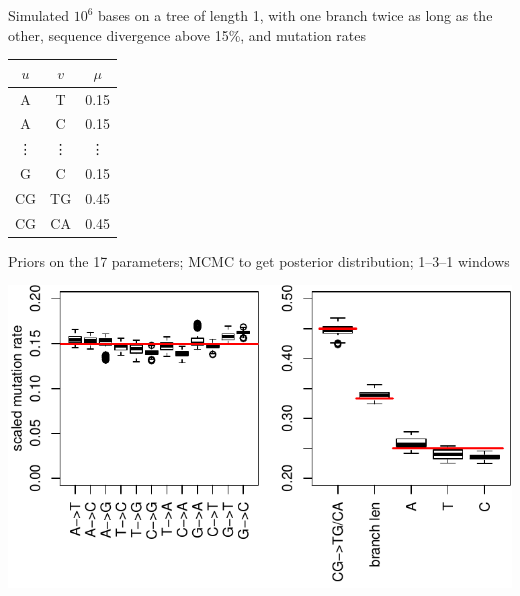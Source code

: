 \documentclass[fontscale=0.38]{baposter}
\begin{document}
\begin{poster}
{  Simulated $10^6$ bases on a tree of length 1, 
  with one branch twice as long as the other,
  sequence divergence above 15\%,
  and mutation rates
  {\small
  \begin{center}
    \begin{tabular}{c@{\quad$\to$\quad}c@{\quad at rate\quad }c}
      $u$  &  $v$  &  $\mu$  \\
      \hline
       A & T   &  0.15  \\
       A & C   &  0.15  \\
       \vdots & \vdots & \vdots \\
       G & C &  0.15  \\
      CG   &  TG   &  0.45 \\
      CG   &  CA   &  0.45 
    \end{tabular}
  \end{center}
  }

  Priors on the 17 parameters; MCMC to get posterior distribution;
  1--3--1 windows

  \begin{center}
    \includegraphics[width=.75\textwidth]{../../../writeup-plots/selsims-2013-06-03-13-17-0187525-estimate-boxplots}
  \end{center}

  

}


\end{poster}%
\end{document}
